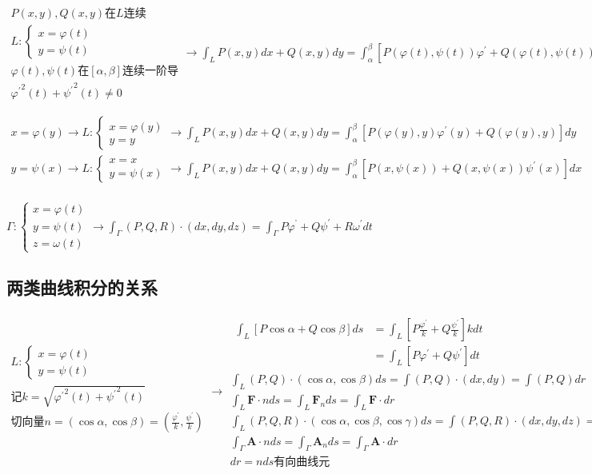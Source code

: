 \documentclass[UTF8]{ctexart}
\newcommand{\mt}[1]{\text{#1}}
\newcommand{\mb}[1]{\textbf{#1}}
\newcommand{\mf}[1]{\left( #1\right)}
\newcommand{\mfc}[1]{\left[ #1 \right]}
\newcommand{\ma}[1]{\begin{array}{llll} #1 \end{array}}
\newcommand{\fcz}[1] {
    \left\{
        \begin{array}{llll} #1 \end{array}
    \right.
}
\begin{document}
$\ma{
    P\mf{x,y},Q\mf{x,y}\mt{在}L\mt{连续}\\
    L:\fcz{x=\varphi\mf{t}\\y=\psi\mf{t}}\\
    \varphi\mf{t},\psi\mf{t}\mt{在}\mfc{\alpha,\beta}\mt{连续一阶导}\\
    {\varphi^{'}}^2\mf{t}+{\psi^{'}}^2\mf{t}\neq 0
}\rightarrow \int_L P\mf{x,y}dx+ Q\mf{x,y}dy=\int_\alpha^\beta \mfc{P\mf{\varphi\mf{t},\psi\mf{t}}\varphi^{'}+ Q\mf{\varphi\mf{t},\psi\mf{t}}\psi^{'}}dt$


$\ma{
    x=\varphi\mf{y} \rightarrow L:\fcz{x=\varphi\mf{y}\\y=y}\rightarrow 
     \int_L P\mf{x,y}dx+ Q\mf{x,y}dy=\int_\alpha^\beta \mfc{P\mf{\varphi\mf{y},y}\varphi^{'}\mf{y}+ Q\mf{\varphi\mf{y},y}}dy\\
    y=\psi\mf{x} \rightarrow L:\fcz{x=x\\y=\psi\mf{x}}\rightarrow
     \int_L P\mf{x,y}dx+ Q\mf{x,y}dy=\int_\alpha^\beta \mfc{P\mf{x,\psi\mf{x}}+ Q\mf{x,\psi\mf{x}}\psi^{'}\mf{x}}dx\\
}$

$\Gamma:\fcz{x=\varphi\mf{t}\\
y=\psi\mf{t}\\
z=\omega\mf{t}} \rightarrow \int_\Gamma \mf{P,Q,R}\cdot \mf{dx,dy,dz}=\int_\Gamma P \varphi^{’} +Q\psi^{'}+R\omega^{'}dt$

\subsection{两类曲线积分的关系}

\noindent
$\ma{L:\fcz{x=\varphi\mf{t}\\y=\psi\mf{t}}\\
\mt{记}k=\sqrt{{\varphi^{'}}^2\mf{t}+{\psi^{'}}^2\mf{t}}\\
\mt{切向量}n=\mf{\cos \alpha,\cos \beta}=\mf{\frac{\varphi^{'}}{k},\frac{\psi^{'}}{k}}\\
}\rightarrow \ma{\ma{
    \int_L\mfc{P\cos\alpha+Q\cos\beta}ds&=\int_L\mfc{P\frac{\varphi^{'}}{k}+Q\frac{\psi^{'}}{k}}kdt\\
    &=\int_L\mfc{P\varphi^{'}+Q\psi^{'}}dt
}\\
\int_L \mf{P,Q}\cdot\mf{\cos \alpha,\cos \beta}ds=\int \mf{P,Q} \cdot \mf{dx,dy}=\int \mf{P,Q} dr\\
\int_L \mb{F}\cdot n ds=\int_L \mb{F}_n ds=\int_L \mb{F} \cdot dr\\
\int_L \mf{P,Q,R}\cdot\mf{\cos \alpha,\cos \beta,\cos \gamma}ds=\int \mf{P,Q,R} \cdot \mf{dx,dy,dz}=\int \mf{P,Q,R} dr\\
\int_\Gamma \mb{A}\cdot n ds=\int_\Gamma \mb{A}_n ds=\int_\Gamma \mb{A} \cdot dr\\
dr=nds \mt{有向曲线元}
}$
\end{document}

